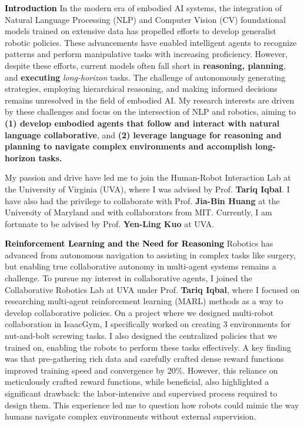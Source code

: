 \documentclass[11pt]{article}
\newcommand{\statement}[1]{\medskip\noindent
  \textcolor{black}{\textbf{#1}}\space
}
\begin{document}
\statement{Introduction} In the modern era of embodied AI systems, the integration of Natural Language Processing (NLP) and Computer Vision (CV) foundational models trained on extensive data has propelled efforts to develop generalist robotic policies. These advancements have enabled intelligent agents to recognize patterns and perform manipulative tasks with increasing proficiency. However, despite these efforts, current models often fall short in \textbf{reasoning, planning}, and \textbf{executing} \textit{long-horizon} tasks. The challenge of autonomously generating strategies, employing hierarchical reasoning, and making informed decisions remains unresolved in the field of embodied AI. My research interests are driven by these challenges and focus on the intersection of NLP and robotics, aiming to \textbf{(1) develop embodied agents that follow and interact with natural language collaborative}, and \textbf{(2) leverage language for reasoning and planning to navigate complex environments and accomplish long-horizon tasks.}

\noindent My passion and drive have led me to join the Human-Robot Interaction Lab at the University of Virginia (UVA), where I was advised by Prof. \textbf{Tariq Iqbal}. I have also had the privilege to collaborate with Prof. \textbf{Jia-Bin Huang} at the University of Maryland and with collaborators from MIT. Currently, I am fortunate to be advised by Prof. \textbf{Yen-Ling Kuo} at UVA.

\statement{Reinforcement Learning and the Need for Reasoning} Robotics has advanced from autonomous navigation to assisting in complex tasks like surgery, but enabling true collaborative autonomy in multi-agent systems remains a challenge. To pursue my interest in collaborative agents, I joined the Collaborative Robotics Lab at UVA under Prof. \textbf{Tariq Iqbal}, where I focused on researching multi-agent reinforcement learning (MARL) methods as a way to develop collaborative policies. On a project where we designed multi-robot collaboration in IsaacGym, I specifically worked on creating 3 environments for nut-and-bolt screwing tasks. I also designed the centralized policies that we trained on, enabling the robots to perform these tasks effectively. A key finding was that pre-gathering rich data and carefully crafted dense reward functions improved training speed and convergence by 20\%. However, this reliance on meticulously crafted reward functions, while beneficial, also highlighted a significant drawback: the labor-intensive and supervised process required to design them. This experience led me to question how robots could mimic the way humans navigate complex environments without external supervision.
\end{document}
